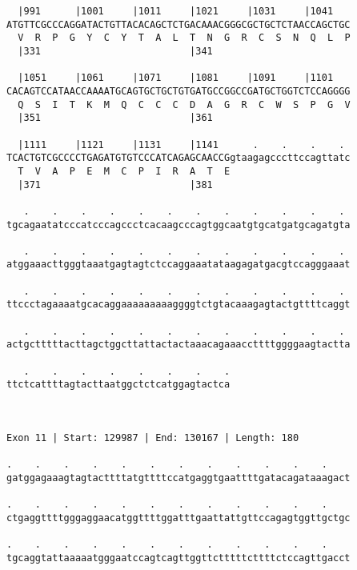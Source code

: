 \documentclass{article}
\begin{document}
\begin{Verbatim}
  |991      |1001     |1011     |1021     |1031     |1041   
ATGTTCGCCCAGGATACTGTTACACAGCTCTGACAAACGGGCGCTGCTCTAACCAGCTGC
  V  R  P  G  Y  C  Y  T  A  L  T  N  G  R  C  S  N  Q  L  P
  |331                          |341                        
  
  |1051     |1061     |1071     |1081     |1091     |1101   
CACAGTCCATAACCAAAATGCAGTGCTGCTGTGATGCCGGCCGATGCTGGTCTCCAGGGG
  Q  S  I  T  K  M  Q  C  C  C  D  A  G  R  C  W  S  P  G  V
  |351                          |361                        
  
  |1111     |1121     |1131     |1141      .    .    .    . 
TCACTGTCGCCCCTGAGATGTGTCCCATCAGAGCAACCGgtaagagcccttccagttatc
  T  V  A  P  E  M  C  P  I  R  A  T  E                     
  |371                          |381                        
  
   .    .    .    .    .    .    .    .    .    .    .    . 
tgcagaatatcccatcccagccctcacaagcccagtggcaatgtgcatgatgcagatgta
                                                            
   .    .    .    .    .    .    .    .    .    .    .    . 
atggaaacttgggtaaatgagtagtctccaggaaatataagagatgacgtccagggaaat
                                                            
   .    .    .    .    .    .    .    .    .    .    .    . 
ttccctagaaaatgcacaggaaaaaaaaaggggtctgtacaaagagtactgttttcaggt
                                                            
   .    .    .    .    .    .    .    .    .    .    .    . 
actgctttttacttagctggcttattactactaaacagaaaccttttggggaagtactta
                                                            
   .    .    .    .    .    .    .    .
ttctcattttagtacttaatggctctcatggagtactca
                                       
                                       
 
Exon 11 | Start: 129987 | End: 130167 | Length: 180
 
.    .    .    .    .    .    .    .    .    .    .    .    
gatggagaaagtagtacttttatgttttccatgaggtgaattttgatacagataaagact
                                                            
.    .    .    .    .    .    .    .    .    .    .    .    
ctgaggttttgggaggaacatggttttggatttgaattattgttccagagtggttgctgc
                                                            
.    .    .    .    .    .    .    .    .    .    .    .    
tgcaggtattaaaaatgggaatccagtcagttggttctttttcttttctccagttgacct
                                                            

\end{Verbatim}
\end{document}
